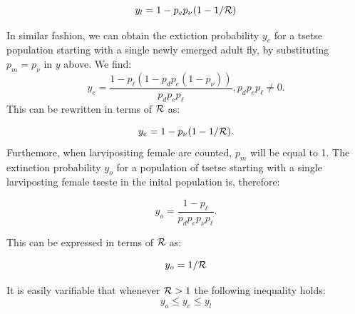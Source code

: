 \documentclass[smallextended]{svjour3}
\newcommand{\comment}[3]{\textcolor{#1}{\textbf{[#2: }\textit{#3}\textbf{]}}}
\newcommand{\jd}[1]{\comment{cyan}{JD}{#1}}
\newcommand{\eb}[1]{\comment{blue}{EB}{#1}}
\begin{document}
\begin{equation}
\label{NewEqn2}
y_l = 1 - p_ep_{\nu}(1-1/{\cal R})	
\end{equation}

In similar fashion, we can obtain the extiction probability $y_e$ for a tsetse population starting with a single newly emerged adult fly, by substituting  $p_m = p_{\nu}$ in $y$ above.
We find:
$$ y_e=\frac{1- p_{\ell}(1 -p_{d}p_{e}(1- p_{\nu}))}{p_{d}p_{e}p_{\ell}},  p_{d}p_{e}p_{\ell} \neq 0. $$ This can be rewritten in terms of ${\cal R}$ as:

\begin{equation}
\label{NewEqn2}
y_e = 1 - p_{\nu}(1-1/{\cal R}).	
\end{equation}
Furthemore, when  larvipositing female are counted, $p_m$ will be equal to 1. The extinction probability $y_o$ for a population of tsetse starting with a single larviposting female tseste in the inital population is, therefore:

 $$y_o = \frac{1-p_{\ell}}{p_{d}p_{e}p_{\nu}p_{\ell}}.$$

This can be expressed in terms of ${\cal R}$ as:

\begin{equation}
\label{NewEqn3}
y_o = 1/{\cal R}	
\end{equation}


It is easily varifiable that whenever ${\cal R}>1$ the following inequality holds:
\begin{equation}
\label{Aretsetsetheorem}
y_{o}\leq y_{e} \leq y_{l}
\end{equation} 

\end{document}
